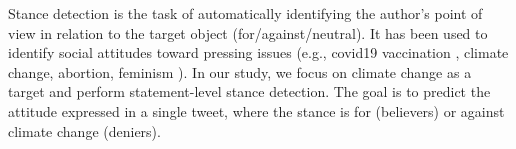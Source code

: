 \documentclass[letterpaper]{article}
\begin{document}
\par \noindent Stance detection is the task of automatically identifying the author's point of view in relation to the target object (for/against/neutral). It has been used to identify social attitudes toward pressing issues (e.g., covid19 vaccination \cite{argyris2021using}, climate change, abortion, feminism \cite{mohammad2016semeval}). In our study, we focus on climate change as a target and perform statement-level stance detection. The goal is to predict the attitude expressed in a single tweet, where the stance is for (believers) or against climate change (deniers). %
\end{document}
